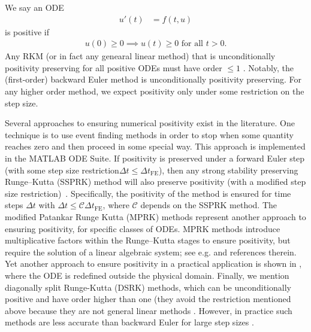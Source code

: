 \documentclass[a4paper]{article}
\numberwithin{equation}{section}
\theoremstyle{plain}
\theoremstyle{definition}
\numberwithin{theorem}{section}
\newcommand{\dt}{{\Delta t}}
\newcommand{\1}{\mathbbm{1}}
\begin{document}
We say an ODE
\begin{align} \label{ode}
    u'(t) & = f(t,u)
\end{align}
is positive if 
\begin{align} \label{continuous-positivity}
    u(0)\ge 0 \implies u(t) \ge 0 \text{ for all } t>0.
\end{align}
Any RKM (or in fact any genearal linear method) that is unconditionally positivity preserving for all positive ODEs
must have order $\le 1$ \cite{bolley_conservation_1978}. Notably, the (first-order)
backward Euler method is unconditionally positivity preserving.
For any higher order method, we expect positivity only under some restriction
on the step size.

Several approaches to ensuring numerical positivity exist in the literature.
One technique is to use event finding methods in order to stop when some quantity
reaches zero and then proceed in some special way. This approach is implemented in the MATLAB ODE Suite.
If positivity is preserved under a forward Euler step (with
some step size restriction$\dt \le \dt_\text{FE}$), then any strong stability preserving Runge--Kutta (SSPRK)
method will also preserve positivity (with a modified step size restriction)~\cite{gottlieb_strong_2011}.
Specifically, the positivity of the method is ensured for time steps $\dt$ with
$\dt \leq {\mathcal C} \dt_\text{FE}$, where ${\mathcal C}$ depends on the SSPRK method.
The modified Patankar Runge Kutta (MPRK) methods represent another approach to ensuring
positivity, for specific classes of ODEs.  MPRK methods introduce multiplicative
factors within the Runge--Kutta stages to ensure positivity, but require the solution
of a linear algebraic system; see e.g. \cite{kopecz_comparison_2019} and references therein.
Yet another approach to ensure positivity in a practical application is shown in \cite{shampine_non-negative_2005},
where the ODE is redefined outside the physical domain. 
Finally, we mention diagonally split Runge-Kutta (DSRK) methods, which can be unconditionally
positive and have order higher than one (they avoid the restriction mentioned above because
they are not general linear methods \cite{horvath_positivity_1998}.  However, in practice such
methods are less accurate than backward Euler for large step sizes \cite{macdonald2007}.
\end{document}
